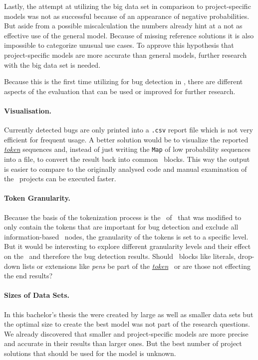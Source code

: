 Lastly, the attempt at utilizing the big data set in comparison to project-specific models was not as successful because of an appearance of negative probabilities. But aside from a possible miscalculation the numbers already hint at a not as effective use of the general model. Because of missing reference solutions it is also impossible to categorize unusual use cases. To approve this hypothesis that project-specific models are more accurate than general models, further research with the big data set is needed.

Because this is the first time utilizing  for bug detection in \scratch{}, there are different aspects of the evaluation that can be used or improved for further research. 

\paragraph{Visualisation.}
Currently detected bugs are only printed into a \texttt{.csv} report file which is not very efficient for frequent usage. A better solution would be to visualize the reported \hyperref[def:token]{\textit{token}} sequences and, instead of just writing the \texttt{Map} of low probability sequences into a file, to convert the result back into common \scratch\ blocks. This way the output is easier to compare to the originally analysed code and manual examination of the \scratch\ projects can be executed faster. 

\paragraph{Token Granularity.}
Because the basis of the tokenization process is the \AST\ of \litterbox\ that was modified to only contain the tokens that are important for bug detection and exclude all information-based \AST\ nodes, the granularity of the tokens is set to a specific level. But it would be interesting to explore different granularity levels and their effect on the \ngram\ and therefore the bug detection results. Should \scratch\ blocks like literals, drop-down lists or extensions like \textit{pens} be part of the \hyperref[def:token]{\textit{token}} \AST\ or are those not effecting the end results? 

\paragraph{Sizes of Data Sets.}
In this bachelor's thesis the  were created by large as well as smaller data sets but the optimal size to create the best model was not part of the research questions. We already discovered that smaller and project-specific models are more precise and accurate in their results than larger ones. But the best number of project solutions that should be used for the model is unknown. 

